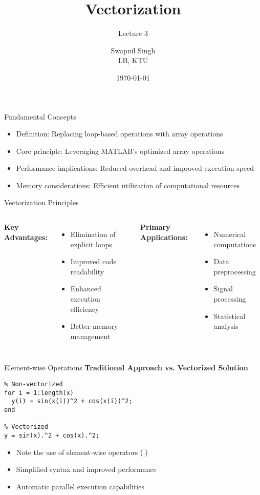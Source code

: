 \documentclass[10pt]{beamer}
\title{Vectorization}
\subtitle{Lecture 3}
\author{Swapnil Singh\\LB, KTU}
\date{\today}
\theoremstyle{plain}%
\theoremstyle{definition}
\theoremstyle{remark}
\begin{document}
\begin{frame}
\titlepage
\end{frame}


\begin{frame}[fragile]{Fundamental Concepts}
  \begin{itemize}
      \item Definition: Replacing loop-based operations with array operations
      \item Core principle: Leveraging MATLAB's optimized array operations
      \item Performance implications: Reduced overhead and improved execution speed
      \item Memory considerations: Efficient utilization of computational resources
  \end{itemize}
\end{frame}

\begin{frame}[fragile]{Vectorization Principles}
  \begin{columns}
      \textbf{Key Advantages:}
      \begin{itemize}
          \item Elimination of explicit loops
          \item Improved code readability
          \item Enhanced execution efficiency
          \item Better memory management
      \end{itemize}
      
      \textbf{Primary Applications:}
      \begin{itemize}
          \item Numerical computations
          \item Data preprocessing
          \item Signal processing
          \item Statistical analysis
      \end{itemize}
  \end{columns}
\end{frame}

\begin{frame}[fragile]{Element-wise Operations}
  \textbf{Traditional Approach vs. Vectorized Solution}
  \begin{lstlisting}
% Non-vectorized
for i = 1:length(x)
  y(i) = sin(x(i))^2 + cos(x(i))^2;
end

% Vectorized
y = sin(x).^2 + cos(x).^2;
  \end{lstlisting}
  \begin{itemize}
      \item Note the use of element-wise operators (.)
      \item Simplified syntax and improved performance
      \item Automatic parallel execution capabilities
  \end{itemize}
\end{frame}
\end{document}
